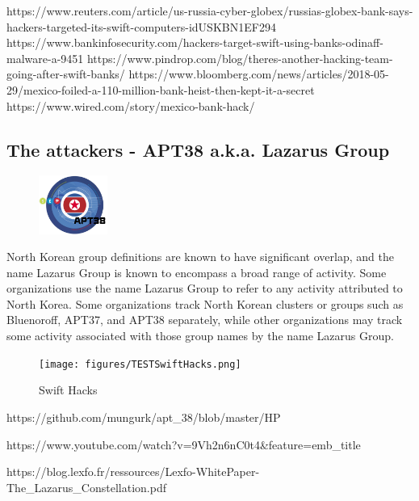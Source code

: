 \documentclass[12pt]{article}
\begin{document}
        https://www.reuters.com/article/us-russia-cyber-globex/russias-globex-bank-says-hackers-targeted-its-swift-computers-idUSKBN1EF294 
        https://www.bankinfosecurity.com/hackers-target-swift-using-banks-odinaff-malware-a-9451
        https://www.pindrop.com/blog/theres-another-hacking-team-going-after-swift-banks/
        https://www.bloomberg.com/news/articles/2018-05-29/mexico-foiled-a-110-million-bank-heist-then-kept-it-a-secret
        https://www.wired.com/story/mexico-bank-hack/
    
    \subsection{The attackers - APT38 a.k.a. Lazarus Group}
        
        \begin{figure}
        \centering
        \includegraphics[width=0.20\textwidth]{figures/apt38.png}
        \end{figure}
        North Korean group definitions are known to have significant overlap, and the name Lazarus Group is known to encompass a broad range of activity. Some organizations use the name Lazarus Group to refer to any activity attributed to North Korea. Some organizations track North Korean clusters or groups such as Bluenoroff, APT37, and APT38 separately, while other organizations may track some activity associated with those group names by the name Lazarus Group.
        
        \begin{figure}[H]
        \centering
        \texttt{[image: figures/TESTSwiftHacks.png]}
        \caption{Swift Hacks}
        \label{fig:SwiftHacks}
        \end{figure}
        
        https://github.com/mungurk/apt_38/blob/master/HP%
        
        https://www.youtube.com/watch?v=9Vh2n6nC0t4&feature=emb_title
        
        https://blog.lexfo.fr/ressources/Lexfo-WhitePaper-The_Lazarus_Constellation.pdf
        
\end{document}
